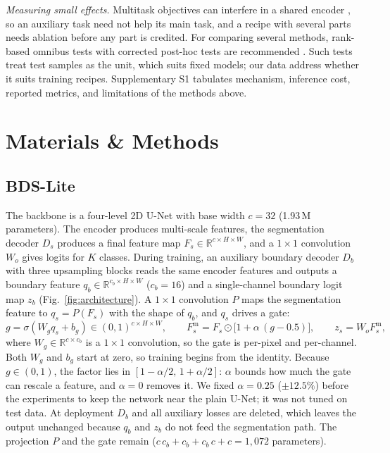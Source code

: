 \documentclass[fleqn,10pt,lineno]{wlpeerj}
\begin{document}
\emph{Measuring small effects.} Multitask objectives can interfere in a shared encoder \citep{Yu2020PCGrad}, so an auxiliary task need not help its main task, and a recipe with several parts needs ablation before any part is credited. For comparing several methods, rank-based omnibus tests with corrected post-hoc tests are recommended \citep{Demsar2006Statistical}. Such tests treat test samples as the unit, which suits fixed models; our data address whether it suits training recipes. Supplementary S1 tabulates mechanism, inference cost, reported metrics, and limitations of the methods above.

\section*{Materials \& Methods}

\subsection*{BDS-Lite}
The backbone is a four-level 2D U-Net with base width $c=32$ (1.93\,M parameters). The encoder produces multi-scale features, the segmentation decoder $D_s$ produces a final feature map $F_s\in\mathbb{R}^{c\times H\times W}$, and a $1\times1$ convolution $W_o$ gives logits for $K$ classes. During training, an auxiliary boundary decoder $D_b$ with three upsampling blocks reads the same encoder features and outputs a boundary feature $q_b\in\mathbb{R}^{c_b\times H\times W}$ ($c_b=16$) and a single-channel boundary logit map $z_b$ (Fig.~\ref{fig:architecture}). A $1\times1$ convolution $P$ maps the segmentation feature to $q_s=P(F_s)$ with the shape of $q_b$, and $q_s$ drives a gate:
\begin{equation}
g=\sigma\!\left(W_g q_s+b_g\right)\in(0,1)^{c\times H\times W},\qquad
F_s^{\mathrm{m}}=F_s\odot\bigl[1+\alpha\,(g-0.5)\bigr],\qquad z_s=W_oF_s^{\mathrm{m}},
\label{eq:gate}
\end{equation}
where $W_g\in\mathbb{R}^{c\times c_b}$ is a $1\times1$ convolution, so the gate is per-pixel and per-channel. Both $W_g$ and $b_g$ start at zero, so training begins from the identity. Because $g\in(0,1)$, the factor lies in $[1-\alpha/2,\,1+\alpha/2]$: $\alpha$ bounds how much the gate can rescale a feature, and $\alpha=0$ removes it. We fixed $\alpha=0.25$ ($\pm12.5\%$) before the experiments to keep the network near the plain U-Net; it was not tuned on test data. At deployment $D_b$ and all auxiliary losses are deleted, which leaves the output unchanged because $q_b$ and $z_b$ do not feed the segmentation path. The projection $P$ and the gate remain ($c\,c_b+c_b+c_b\,c+c=1{,}072$ parameters).
\end{document}
